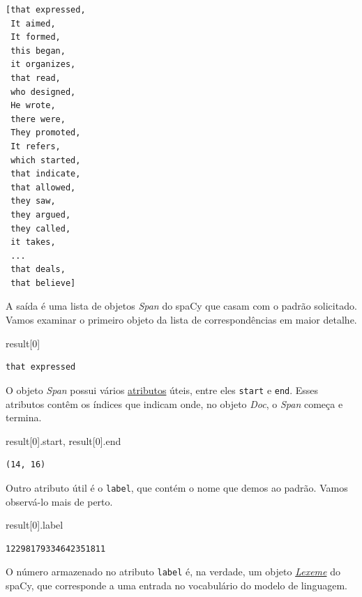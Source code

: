 \documentclass[
  brazilian,
]{article}
\newenvironment{Shaded}{}{}
\newcommand{\DecValTok}[1]{\textcolor[rgb]{0.25,0.63,0.44}{#1}}
\newcommand{\NormalTok}[1]{#1}
\begin{document}
\begin{verbatim}
[that expressed,
 It aimed,
 It formed,
 this began,
 it organizes,
 that read,
 who designed,
 He wrote,
 there were,
 They promoted,
 It refers,
 which started,
 that indicate,
 that allowed,
 they saw,
 they argued,
 they called,
 it takes,
 ...
 that deals,
 that believe]
\end{verbatim}

A saída é uma lista de objetos \emph{Span} do spaCy que casam com o
padrão solicitado. Vamos examinar o primeiro objeto da lista de
correspondências em maior detalhe.

\begin{Shaded}
\begin{Highlighting}[]
\NormalTok{result[}\DecValTok{0}\NormalTok{]}
\end{Highlighting}
\end{Shaded}

\begin{verbatim}
that expressed
\end{verbatim}

O objeto \emph{Span} possui vários
\href{https://spacy.io/api/span}{atributos} úteis, entre eles
\texttt{start} e \texttt{end}. Esses atributos contêm os índices que
indicam onde, no objeto \emph{Doc}, o \emph{Span} começa e termina.

\begin{Shaded}
\begin{Highlighting}[]
\NormalTok{result[}\DecValTok{0}\NormalTok{].start, result[}\DecValTok{0}\NormalTok{].end}
\end{Highlighting}
\end{Shaded}

\begin{verbatim}
(14, 16)
\end{verbatim}

Outro atributo útil é o \texttt{label}, que contém o nome que demos ao
padrão. Vamos observá-lo mais de perto.

\begin{Shaded}
\begin{Highlighting}[]
\NormalTok{result[}\DecValTok{0}\NormalTok{].label}
\end{Highlighting}
\end{Shaded}

\begin{verbatim}
12298179334642351811
\end{verbatim}

O número armazenado no atributo \texttt{label} é, na verdade, um objeto
\href{https://spacy.io/api/lexeme}{\emph{Lexeme}} do spaCy, que
corresponde a uma entrada no vocabulário do modelo de linguagem.
\end{document}
